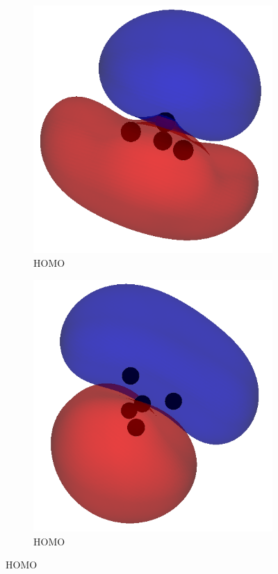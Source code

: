 \documentclass[12pt]{article}
\begin{document}
\begin{figure}[H]
    \vspace{1em}

    \begin{subfigure}[b]{0.45\textwidth}
        \includegraphics[width=\textwidth]{figures/nh3_homo.png}
        \caption{ HOMO}
    \end{subfigure}
    \hfill
    \begin{subfigure}[b]{0.45\textwidth}
        \includegraphics[width=\textwidth]{figures/ch4_homo.png}
        \caption{ HOMO}
    \end{subfigure}


\end{figure}
\end{document}
